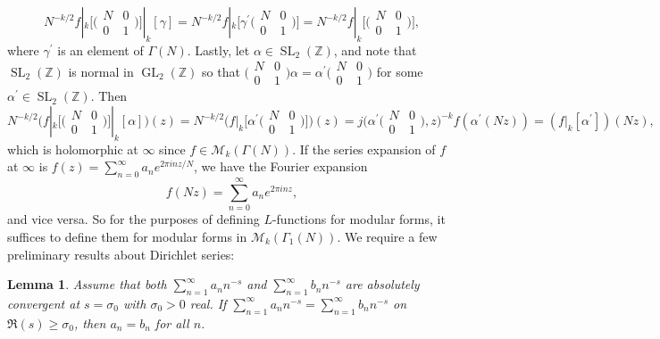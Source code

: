 \documentclass[10pt,leqno,twoside]{article}
\theoremstyle{plain}
\newtheorem{lemma}[lem]{Lemma}
\theoremstyle{definition}
\numberwithin{equation}{section}
\numberwithin{lem}{section}
\DeclareMathOperator{\GL}{GL}
\DeclareMathOperator{\SL}{SL}
\newcommand{\slz}{\SL_2(\mathbb{Z})}
\begin{document}
\[N^{-k/2}f|_k\big[\big(\!\begin{smallmatrix}
    N & 0 \\ 0 & 1
\end{smallmatrix}\!\big)\big]|_k[\gamma] = N^{-k/2}f|_k\big[\gamma^\prime\big(\!\begin{smallmatrix}
    N & 0 \\ 0 & 1
\end{smallmatrix}\!\big)\big] = N^{-k/2}f|_k\big[\big(\!\begin{smallmatrix}
    N & 0 \\ 0 & 1
\end{smallmatrix}\!\big)\big],\] where $\gamma^\prime$ is an element of $\varGamma(N)$. Lastly, let $\alpha\in \slz$, and note that $\slz$ is normal in $\GL_2(\mathbb Z)$ so that $\big(\!\begin{smallmatrix}
    N & 0 \\ 0 & 1
\end{smallmatrix}\!\big)\alpha = \alpha^\prime \big(\!\begin{smallmatrix}
    N & 0 \\ 0 & 1
\end{smallmatrix}\!\big)$ for some $\alpha^\prime\in\slz$. Then 
\[N^{-k/2}\Big(f|_k\big[\big(\!\begin{smallmatrix}
    N & 0 \\ 0 & 1
\end{smallmatrix}\!\big)\big]|_k[\alpha]\Big)(z) = N^{-k/2}\Big(f|_k\big[\alpha^\prime\big(\!\begin{smallmatrix}
    N & 0 \\ 0 & 1
\end{smallmatrix}\!\big)\big]\Big)(z) = j\big(\alpha^\prime\big(\!\begin{smallmatrix}
    N & 0 \\ 0 & 1
\end{smallmatrix}\!\big),z\big)^{-k}f(\alpha^\prime(Nz)) = (f|_k[\alpha^\prime])(Nz),\] which is holomorphic at $\infty$ since $f\in\mathcal M_k(\varGamma(N))$. If the  series expansion of $f$ at $\infty$ is $f(z) = \sum_{n =0}^\infty a_ne^{2\pi i n z/N}$, we have the Fourier expansion
\[f(Nz) = \sum_{n =0}^\infty a_ne^{2\pi i n z},\] and vice versa. So for the purposes of defining $L$-functions for modular forms, it suffices to define them for modular forms in $\mathcal M_k(\varGamma_1(N))$. We require a few preliminary results about Dirichlet series:
\begin{lemma}\label{lem: miyake lem 3.2.1}
    Assume that both $\sum_{n=1}^\infty a_nn^{-s}$ and $\sum_{n=1}^\infty b_nn^{-s}$ are absolutely convergent at $s = \sigma_0$ with $\sigma_0>0$ real. If $\sum_{n=1}^\infty a_nn^{-s} = \sum_{n=1}^\infty b_nn^{-s}$ on $\Re(s)\geq \sigma_0$, then $a_n = b_n$ for all $n$.
\end{lemma}
\end{document}
